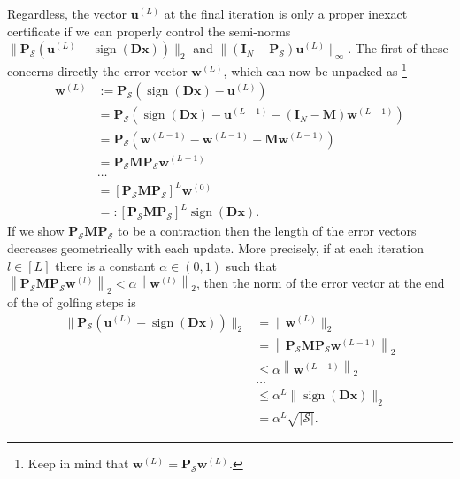 Regardless, the vector $\mathbf{u}^{(L)}$ at the final iteration is only a proper inexact certificate if we can properly control the semi-norms $\| \mathbf{P}_\mathcal{S} ( \mathbf{u}^{(L)} - \operatorname{sign} \left ( \mathbf{Dx} \right ) ) \|_2$ and $\| (\mathbf{I}_N - \mathbf{P}_\mathcal{S}) \mathbf{u}^{(L)} \|_{\infty}$. The first of these concerns directly the error vector $\mathbf{w}^{(L)}$, which can now be unpacked as \footnote{Keep in mind that $\mathbf{w}^{(L)} = \mathbf{P}_\mathcal{S}\mathbf{w}^{(L)}$.}
\begin{align*}
    \mathbf{w}^{(L)} & := \mathbf{P}_\mathcal{S} ( \operatorname{sign} \left ( \mathbf{Dx} \right ) - \mathbf{u}^{(L)} ) \\
    & = \mathbf{P}_\mathcal{S} \left( \operatorname{sign} \left ( \mathbf{Dx} \right ) - \mathbf{u}^{(L-1)} - \left ( \mathbf{I}_N - \mathbf{M} \right ) \mathbf{w}^{(L-1)} \right)\\
    & = \mathbf{P}_\mathcal{S} \left( \mathbf{w}^{(L-1)} - \mathbf{w}^{(L-1)} + \mathbf{M} \mathbf{w}^{(L-1)} \right)\\
    & = \mathbf{P}_\mathcal{S} \mathbf{M} \mathbf{P}_\mathcal{S} \mathbf{w}^{(L-1)} \\
    & \dots \\
    & = \left [ \mathbf{P}_\mathcal{S} \mathbf{M} \mathbf{P}_\mathcal{S} \right ]^{L} \mathbf{w}^{(0)}\\
    & =: \left [ \mathbf{P}_\mathcal{S} \mathbf{M} \mathbf{P}_\mathcal{S} \right ]^{L} \operatorname{sign} \left ( \mathbf{Dx} \right ).
\end{align*}
If we show $\mathbf{P}_\mathcal{S} \mathbf{M} \mathbf{P}_\mathcal{S}$ to be a contraction then the length of the error vectors decreases geometrically with each update. More precisely, if at each iteration $l \in [L]$ there is a constant $\alpha \in (0, 1)$ such that $\left \| \mathbf{P}_\mathcal{S} \mathbf{M} \mathbf{P}_\mathcal{S} \mathbf{w}^{(l)} \right \|_2 < \alpha \left \| \mathbf{w}^{(l)} \right \|_2$, then the norm of the error vector at the end of the of golfing steps is
\begin{align}
    \| \mathbf{P}_\mathcal{S} ( \mathbf{u}^{(L)} - \operatorname{sign} \left ( \mathbf{Dx} \right ) ) \|_2 & = \|\mathbf{w}^{(L)}\|_2 \nonumber \\
    & = \left \| \mathbf{P}_\mathcal{S} \mathbf{M} \mathbf{P}_\mathcal{S} \mathbf{w}^{(L-1)} \right \|_2 \nonumber \\
    & \leq \alpha \left \| \mathbf{w}^{(L-1)}  \right \|_2 \nonumber \\
    & \dots \nonumber \\
    & \leq \alpha^{L} \| \operatorname{sign} \left ( \mathbf{Dx} \right ) \|_2 \nonumber \\
    & = \alpha^{L} \sqrt{|\mathcal{S}|}\label{eq:golf_bound_error}.
\end{align}
